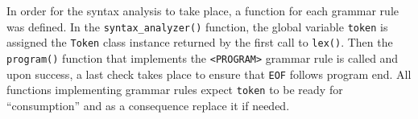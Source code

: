 \documentclass{article}
\newcommand{\pythonscript}[2]{
\begin{itemize}
\item[]
\end{itemize}
}
\def\code#1{\texttt{#1}} %
\newcommand{\enterProblemHeader}[1]{
\nobreak\extramarks{#1}{#1 continued on next page\ldots}\nobreak
\nobreak\extramarks{#1 (continued)}{#1 continued on next page\ldots}\nobreak
}
\newcommand{\exitProblemHeader}[1]{
\nobreak\extramarks{#1 (continued)}{#1 continued on next page\ldots}\nobreak
\nobreak\extramarks{#1}{}\nobreak
}
\newcounter{homeworkProblemCounter} %
\newcommand{\homeworkProblemName}{}
\newenvironment{homeworkProblem}[1][Problem \arabic{homeworkProblemCounter}]{ %
\stepcounter{homeworkProblemCounter} %
\renewcommand{\homeworkProblemName}{#1} %
\section{\homeworkProblemName} %
\enterProblemHeader{\homeworkProblemName} %
}{
\exitProblemHeader{\homeworkProblemName} %
}
\newcommand{\problemAnswer}[1]{ %
\noindent\framebox[\columnwidth][c]{\begin{minipage}{0.98\columnwidth}#1\end{minipage}} %
}
\begin{document}
In order for the syntax analysis to take place, a function for each grammar rule was defined. 
In the \code{syntax\_analyzer()} function, the global variable \code{token} is assigned the
\code{Token} class instance returned by the first call to \code{lex()}. Then the \code{program()}
function that implements the \code{<PROGRAM>} grammar rule is called and upon success, a last
check takes place to ensure that \code{EOF} follows program end. All functions implementing
grammar rules expect \code{token} to be ready for ``consumption'' and as a consequence 
replace it if needed.






% 
% 

\end{document}
